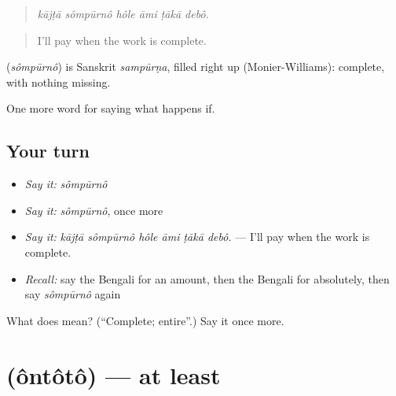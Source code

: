\begin{quote}
     
\end{quote}

\begin{quote}
\emph{kājṭā sômpūrnô hôle āmi ṭākā debô.}
\end{quote}

\begin{quote}
I'll pay when the work is complete.
\end{quote}

\begin{cousinweb}
\textbf{} (\emph{sômpūrnô}) is Sanskrit \emph{sampūrṇa}, filled right up (Monier-Williams): complete, with nothing missing.
\end{cousinweb}

\begin{grammarlens}[title={What you've built}]
One more word for saying what happens if.
\end{grammarlens}

\subsection*{Your turn}
\begin{itemize}
\raggedright
  \item \emph{Say it:} \emph{sômpūrnô}
  \item \emph{Say it:} \emph{sômpūrnô}, once more
  \item \emph{Say it:} \emph{kājṭā sômpūrnô hôle āmi ṭākā debô.} — I'll pay when the work is complete.
  \item \emph{Recall:} say the Bengali for an amount, then the Bengali for absolutely, then say \emph{sômpūrnô} again
\end{itemize}

\begin{tcolorbox}[breakable,colback=teal!4,colframe=teal!35!black,title={Before you move on}]
What does  mean? (\textquotedblleft{}Complete; entire\textquotedblright{}.) Say it once more.
\end{tcolorbox}
\section[\texorpdfstring{\bn{অন্তত} (ôntôtô)}{অন্তত (ôntôtô)}]{ (ôntôtô) — at least}

\label{lesson:BN-C373-ontoto}



